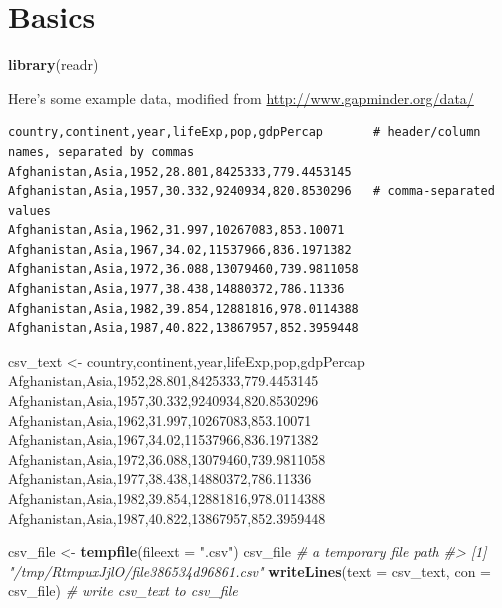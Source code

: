 \documentclass[
]{report}
\newenvironment{Shaded}{\begin{snugshade}}{\end{snugshade}}
\newcommand{\CommentTok}[1]{\textcolor[rgb]{0.56,0.35,0.01}{\textit{#1}}}
\newcommand{\DataTypeTok}[1]{\textcolor[rgb]{0.13,0.29,0.53}{#1}}
\newcommand{\KeywordTok}[1]{\textcolor[rgb]{0.13,0.29,0.53}{\textbf{#1}}}
\newcommand{\NormalTok}[1]{#1}
\newcommand{\StringTok}[1]{\textcolor[rgb]{0.31,0.60,0.02}{#1}}
\begin{document}
\hypertarget{basics}{%
\section{Basics}\label{basics}}

\begin{Shaded}
\begin{Highlighting}[]
\KeywordTok{library}\NormalTok{(readr)}
\end{Highlighting}
\end{Shaded}

Here's some example data, modified from \url{http://www.gapminder.org/data/}

\begin{verbatim}
country,continent,year,lifeExp,pop,gdpPercap       # header/column names, separated by commas
Afghanistan,Asia,1952,28.801,8425333,779.4453145
Afghanistan,Asia,1957,30.332,9240934,820.8530296   # comma-separated values
Afghanistan,Asia,1962,31.997,10267083,853.10071
Afghanistan,Asia,1967,34.02,11537966,836.1971382
Afghanistan,Asia,1972,36.088,13079460,739.9811058
Afghanistan,Asia,1977,38.438,14880372,786.11336
Afghanistan,Asia,1982,39.854,12881816,978.0114388
Afghanistan,Asia,1987,40.822,13867957,852.3959448
\end{verbatim}

\begin{Shaded}
\begin{Highlighting}[]
\NormalTok{csv\_text \textless{}{-}}\StringTok{ }
\StringTok{\textquotesingle{}country,continent,year,lifeExp,pop,gdpPercap     }
\StringTok{Afghanistan,Asia,1952,28.801,8425333,779.4453145}
\StringTok{Afghanistan,Asia,1957,30.332,9240934,820.8530296}
\StringTok{Afghanistan,Asia,1962,31.997,10267083,853.10071}
\StringTok{Afghanistan,Asia,1967,34.02,11537966,836.1971382}
\StringTok{Afghanistan,Asia,1972,36.088,13079460,739.9811058}
\StringTok{Afghanistan,Asia,1977,38.438,14880372,786.11336}
\StringTok{Afghanistan,Asia,1982,39.854,12881816,978.0114388}
\StringTok{Afghanistan,Asia,1987,40.822,13867957,852.3959448\textquotesingle{}}

\NormalTok{csv\_file \textless{}{-}}\StringTok{ }\KeywordTok{tempfile}\NormalTok{(}\DataTypeTok{fileext =} \StringTok{".csv"}\NormalTok{)      }
\NormalTok{csv\_file }\CommentTok{\# a temporary file path}
\CommentTok{\#\textgreater{} [1] "/tmp/RtmpuxJjlO/file386534d96861.csv"}
\KeywordTok{writeLines}\NormalTok{(}\DataTypeTok{text =}\NormalTok{ csv\_text, }\DataTypeTok{con =}\NormalTok{ csv\_file) }\CommentTok{\# write \textasciigrave{}csv\_text\textasciigrave{} to \textasciigrave{}csv\_file\textasciigrave{}}
\end{Highlighting}
\end{Shaded}
\end{document}
